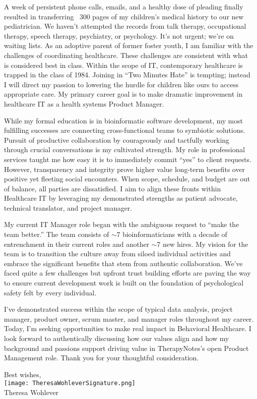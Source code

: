 \documentclass[10pt,letterpaper]{article}
\begin{document}
\begin{flushleft}
	
	A week of persistent phone calls, emails, and a healthy dose of pleading finally resulted in transferring ~300 pages of my children\rq{}s medical history to our new pediatrician. We haven\rq{}t attempted the records from talk therapy, occupational therapy, speech therapy, psychiatry, or psychology. It\rq{}s not urgent; we\rq{}re on waiting lists. As an adoptive parent of former foster youth, I am familiar with the challenges of coordinating healthcare. These challenges are consistent with what is considered best in class. Within the scope of IT, contemporary healthcare is trapped in the class of 1984. Joining in “Two Minutes Hate” is tempting; instead I will direct my passion to lowering the hurdle for children like ours to access appropriate care. My primary career goal is to make dramatic improvement in healthcare IT as a health systems Product Manager.

	While my formal education is in bioinformatic software development, my most fulfilling successes are connecting cross-functional teams to symbiotic solutions. Pursuit of productive collaboration by courageously and tactfully working through crucial conversations is my cultivated strength. My role in professional services taught me how easy it is to immediately commit “yes” to client requests. However, transparency and integrity prove higher value long-term benefits over positive yet fleeting social encounters. When scope, schedule, and budget are out of balance, all parties are dissatisfied. I aim to align these fronts within Healthcare IT by leveraging my demonstrated strengths as patient advocate, technical translator, and project manager.
 
	My current IT Manager role began with the ambiguous request to “make the team better.” The team consists of \(\sim \)7 bioinformaticians with a decade of entrenchment in their current roles and another \(\sim \)7 new hires. My vision for the team is to transition the culture away from siloed individual activities and embrace the significant benefits that stem from authentic collaboration. We\rq{}ve faced quite a few challenges but upfront trust building efforts are paving the way to ensure current development work is built on the foundation of psychological safety felt by every individual.  
	
	I\rq{}ve demonstrated success within the scope of typical data analysis, project manager, product owner, scrum master, and manager roles throughout my career. Today, I\rq{}m seeking opportunities to make real impact in Behavioral Healthcare. I look forward to authentically discussing how our values align and how my background and passions support driving value in TherapyNotes\rq{}s open Product Management role. Thank you for your thoughtful consideration.
	

\end{flushleft}


\hspace*{.6\linewidth} Best wishes, \\
\hspace*{.57\linewidth} \texttt{[image: TheresaWohleverSignature.png]}  {\vspace{-9pt}} \\
\hspace*{.6\linewidth}  Theresa Wohlever
\end{document}
